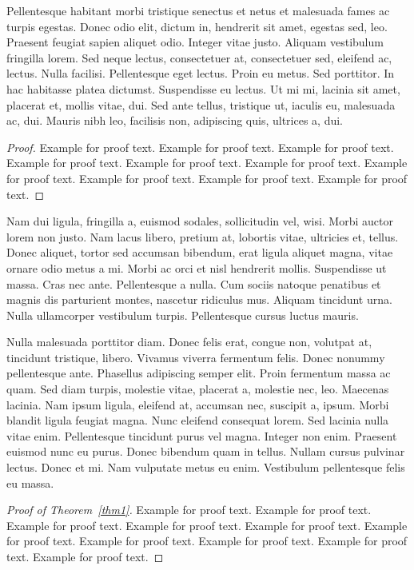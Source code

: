 \documentclass[CJCE,STIX2COL]{WileyNJD-v2}
\begin{document}
Pellentesque habitant morbi tristique senectus et netus et malesuada fames ac turpis egestas. Donec odio elit,
dictum in, hendrerit sit amet, egestas sed, leo. Praesent feugiat sapien aliquet odio. Integer vitae justo. Aliquam
vestibulum fringilla lorem. Sed neque lectus, consectetuer at, consectetuer sed, eleifend ac, lectus. Nulla facilisi.
Pellentesque eget lectus. Proin eu metus. Sed porttitor. In hac habitasse platea dictumst. Suspendisse eu lectus. Ut
mi mi, lacinia sit amet, placerat et, mollis vitae, dui. Sed ante tellus, tristique ut, iaculis eu, malesuada ac, dui.
Mauris nibh leo, facilisis non, adipiscing quis, ultrices a, dui.

\begin{proof}
Example for proof text. Example for proof text. Example for proof text. Example for proof text. Example for proof text. Example for proof text. Example for proof text. Example for proof text. Example for proof text. Example for proof text. 
\end{proof}

Nam dui ligula, fringilla a, euismod sodales, sollicitudin vel, wisi. Morbi auctor lorem non justo. Nam lacus libero,
pretium at, lobortis vitae, ultricies et, tellus. Donec aliquet, tortor sed accumsan bibendum, erat ligula aliquet magna,
vitae ornare odio metus a mi. Morbi ac orci et nisl hendrerit mollis. Suspendisse ut massa. Cras nec ante. Pellentesque
a nulla. Cum sociis natoque penatibus et magnis dis parturient montes, nascetur ridiculus mus. Aliquam tincidunt
urna. Nulla ullamcorper vestibulum turpis. Pellentesque cursus luctus mauris.

Nulla malesuada porttitor diam. Donec felis erat, congue non, volutpat at, tincidunt tristique, libero. Vivamus
viverra fermentum felis. Donec nonummy pellentesque ante. Phasellus adipiscing semper elit. Proin fermentum massa
ac quam. Sed diam turpis, molestie vitae, placerat a, molestie nec, leo. Maecenas lacinia. Nam ipsum ligula, eleifend
at, accumsan nec, suscipit a, ipsum. Morbi blandit ligula feugiat magna. Nunc eleifend consequat lorem. Sed lacinia
nulla vitae enim. Pellentesque tincidunt purus vel magna. Integer non enim. Praesent euismod nunc eu purus. Donec
bibendum quam in tellus. Nullam cursus pulvinar lectus. Donec et mi. Nam vulputate metus eu enim. Vestibulum
pellentesque felis eu massa.

\begin{proof}[Proof of Theorem~{\upshape\ref{thm1}}]
Example for proof text. Example for proof text. Example for proof text. Example for proof text. Example for proof text. Example for proof text. Example for proof text. Example for proof text. Example for proof text. Example for proof text. 
\end{proof}
\end{document}
